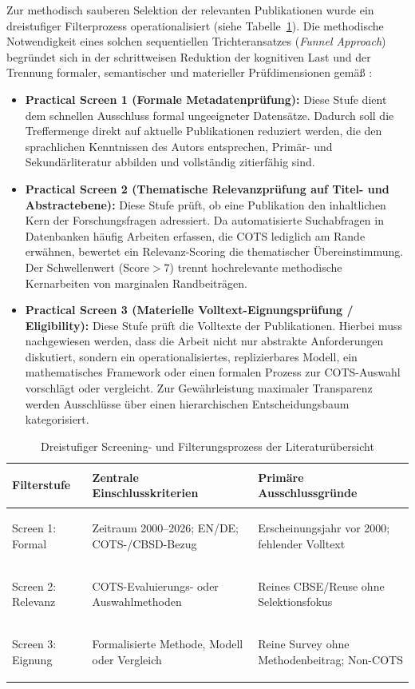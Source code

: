 Zur methodisch sauberen Selektion der relevanten Publikationen wurde ein dreistufiger Filterprozess operationalisiert (siehe Tabelle~\ref{tab:screening_kriterien}). Die methodische Notwendigkeit eines solchen sequentiellen Trichteransatzes (\textit{Funnel Approach}) begründet sich in der schrittweisen Reduktion der kognitiven Last und der Trennung formaler, semantischer und materieller Prüfdimensionen gemäß \textcite[S.~892 bis 893]{2NHFUF5N}:
\begin{itemize}[leftmargin=*]
  \item \textbf{Practical Screen 1 (Formale Metadatenprüfung):} Diese Stufe dient dem schnellen Ausschluss formal ungeeigneter Datensätze. Dadurch soll die Treffermenge direkt auf aktuelle Publikationen reduziert werden, die den sprachlichen Kenntnissen des Autors entsprechen, Primär- und Sekundärliteratur abbilden und vollständig zitierfähig sind.
  \item \textbf{Practical Screen 2 (Thematische Relevanzprüfung auf Titel- und Abstractebene):} Diese Stufe prüft, ob eine Publikation den inhaltlichen Kern der Forschungsfragen adressiert. Da automatisierte Suchabfragen in Datenbanken häufig Arbeiten erfassen, die COTS lediglich am Rande erwähnen, bewertet ein Relevanz-Scoring die thematischer Übereinstimmung. Der Schwellenwert ($\text{Score} > 7$) trennt hochrelevante methodische Kernarbeiten von marginalen Randbeiträgen.
  \item \textbf{Practical Screen 3 (Materielle Volltext-Eignungsprüfung / Eligibility):} Diese Stufe prüft die Volltexte der Publikationen. Hierbei muss nachgewiesen werden, dass die Arbeit nicht nur abstrakte Anforderungen diskutiert, sondern ein operationalisiertes, replizierbares Modell, ein mathematisches Framework oder einen formalen Prozess zur COTS-Auswahl vorschlägt oder vergleicht. Zur Gewährleistung maximaler Transparenz werden Ausschlüsse über einen hierarchischen Entscheidungsbaum kategorisiert.
\end{itemize}

\begin{table}[htbp]
  \centering
  \small
  \caption{Dreistufiger Screening- und Filterungsprozess der Literaturübersicht}
  \label{tab:screening_kriterien}
  \begin{tabularx}{\textwidth}{>{\bfseries\raggedright\arraybackslash}p{2.6cm}>{\raggedright\arraybackslash}X>{\raggedright\arraybackslash}X}
    \toprule
    Filterstufe & Zentrale Einschlusskriterien & Primäre Ausschlussgründe \\
    \midrule
    Screen 1: Formal & Zeitraum 2000--2026; EN/DE; COTS-/CBSD-Bezug & Erscheinungsjahr vor 2000; fehlender Volltext \\
    Screen 2: Relevanz & COTS-Evaluierungs- oder Auswahlmethoden & Reines CBSE/Reuse ohne Selektionsfokus \\
    Screen 3: Eignung & Formalisierte Methode, Modell oder Vergleich & Reine Survey ohne Methodenbeitrag; Non-COTS \\
    \bottomrule
  \end{tabularx}
\end{table}

